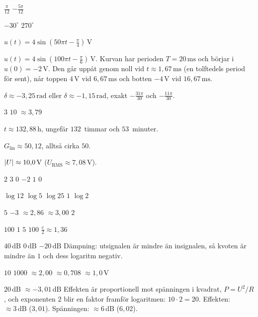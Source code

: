 
\begin{facit}

  $\frac{\pi}{12}$  $-\frac{5\pi}{12}$

  $-30^{\circ}$  $270^{\circ}$

 $u(t) = 4\sin\left(50\pi t - \frac{\pi}{4}\right)\,\text{V}$

 $u(t) = 4\sin\left(100\pi t - \frac{\pi}{6}\right)\,\text{V}$. Kurvan har
perioden $T = 20\,\text{ms}$ och börjar i $u(0) = -2\,\text{V}$. Den går uppåt genom noll vid
$t \approx 1{,}67\,\text{ms}$ (en tolftedels period för sent), når toppen $4\,\text{V}$ vid
$6{,}67\,\text{ms}$ och botten $-4\,\text{V}$ vid $16{,}67\,\text{ms}$.

 $\delta \approx -3{,}25\,\text{rad}$ eller $\delta \approx -1{,}15\,\text{rad}$,
exakt $-\frac{31\pi}{30}$ och $-\frac{11\pi}{30}$.

  $3$  $10$  $\approx 3{,}79$

 $t \approx 132{,}88\,\text{h}$, ungefär $132$~timmar och $53$~minuter.

 $G_{\text{lin}} \approx 50{,}12$, alltså cirka $50$.

 $\lvert U\rvert \approx 10{,}0\,\text{V}$ ($U_{\text{RMS}} \approx 7{,}08\,\text{V}$).

  $2$  $3$  $0$  $-2$  $1$  $0$

  $\log 12$  $\log 5$  $\log 25$  $1$  $\log 2$

  $5$  $-3$  $\approx 2{,}86$  $\approx 3{,}00$  $2$

  $100$  $1$  $5$  $100$
 $\frac{e}{2} \approx 1{,}36$

  $40\,\text{dB}$  $0\,\text{dB}$  $-20\,\text{dB}$
 Dämpning: utsignalen är mindre än insignalen, så kvoten är mindre än $1$ och dess
logaritm negativ.

  $10$  $1000$  $\approx 2{,}00$  $\approx 0{,}708$
 $\approx 1{,}0\,\text{V}$

  $20\,\text{dB}$  $\approx -3{,}01\,\text{dB}$
 Effekten är proportionell mot spänningen i kvadrat, $P = U^2/R$, och exponenten
$2$ blir en faktor framför logaritmen: $10 \cdot 2 = 20$.
 Effekten: $\approx 3\,\text{dB}$ ($3{,}01$). Spänningen: $\approx 6\,\text{dB}$ ($6{,}02$).


\end{facit}
